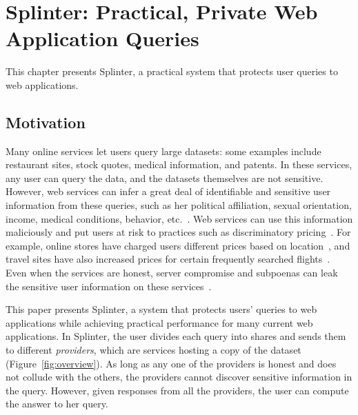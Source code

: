 \section{Splinter: Practical, Private Web Application Queries}
\label{chap:splinter}

This chapter presents Splinter, a practical system that protects user
queries to web applications.

\subsection{Motivation}
Many online services let users query large datasets:
some examples include restaurant sites, stock quotes,
medical information, and patents. In these services, 
any user can query the data, and the datasets themselves
are not sensitive. However, web services can infer a great deal of identifiable and sensitive
user information from these queries, such as her 
political affiliation, sexual orientation, income,
medical conditions, behavior, etc.~\cite{narayanan2010myths, narayanan2008robust}.
Web services can use this information maliciously and put users at risk to practices such as
discriminatory pricing~\cite{amazon-disc-pricing, price-disc2, hannak2014measuring}.
For example, online stores have charged users different prices based on location~\cite{price-disc}, and
travel sites have also increased prices for certain frequently searched flights~\cite{travel-pricing}.
Even when the services are honest, server compromise and subpoenas can leak the sensitive user
information on these services~\cite{ravichandran2009capturing, yelp-compromise, twitter-compromise}.

This paper presents Splinter, a system that protects users' queries to web applications
while achieving practical performance for many current web applications.
In Splinter, the user divides each query into shares and sends them to different
\emph{providers}, which are services hosting a copy of the dataset (Figure~\ref{fig:overview}).
As long as any one of the providers is honest and does not
collude with the others, the providers cannot discover sensitive
information in the query.
However, given responses from all the providers, the user
can compute the answer to her query.

